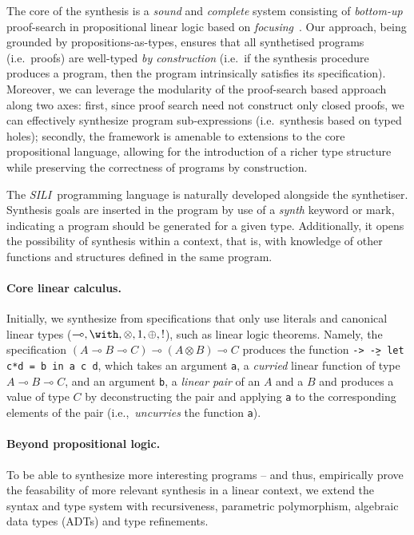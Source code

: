 \documentclass{llncs}
\newcommand{\lolli}{\multimap}
\newcommand{\tensor}{\otimes}
\newcommand{\bang}{{!}}
\newcommand{\synname}{\emph{SILI}}
\begin{document}
The core of the synthesis is a \emph{sound} and \emph{complete} system
consisting of \emph{bottom-up} proof-search in propositional linear
logic based on \emph{focusing}~\cite{}. Our approach, being grounded
by propositions-as-types, ensures that all synthetised programs
(i.e.~proofs) are well-typed \emph{by construction} (i.e.~if the
synthesis procedure produces a program, then the program intrinsically
satisfies its specification). Moreover, we can leverage the modularity
of the proof-search based approach along two axes: first, since proof
search need not construct only closed proofs, we can effectively
synthesize program sub-expressions (i.e.~synthesis based on typed
holes); secondly, the framework is amenable to extensions to the core
propositional language, allowing for the introduction of a richer type
structure while preserving the correctness of programs by
construction.

The \synname\ programming language is naturally developed alongside
the synthetiser. Synthesis goals are inserted in the program by use of
a \emph{synth} keyword or mark, indicating a program should be
generated for a given type. Additionally, it opens the possibility of
synthesis within a context, that is, with knowledge of other functions and
structures defined in the same program.


\paragraph{Core linear calculus.} Initially, we synthesize from
specifications that only use literals and canonical linear types ($\lolli, \with, \tensor, 1,
\oplus, \bang$), such as linear logic theorems. Namely,
the specification $(A \lolli B \lolli C) \lolli (A \tensor B) \lolli C$ produces
the function \texttt{\a -> \b -> let c*d = b in a c d},
which takes an argument \texttt{a}, a
\emph{curried} linear function of type $A \lolli B \lolli C$,  and an
argument \texttt{b}, a \emph{linear
  pair} of an $A$ and a $B$ and produces a value of type $C$ by
deconstructing the pair and applying \texttt{a} to the
corresponding elements of the pair (i.e.,~\emph{uncurries} the
function \texttt{a}).


\paragraph{Beyond propositional logic.} To be able to synthesize more
interesting programs -- and thus, empirically prove the feasability of
more relevant synthesis in a linear context, we extend the syntax and
type system with recursiveness, parametric polymorphism, algebraic
data types (ADTs) and type refinements.
\end{document}
